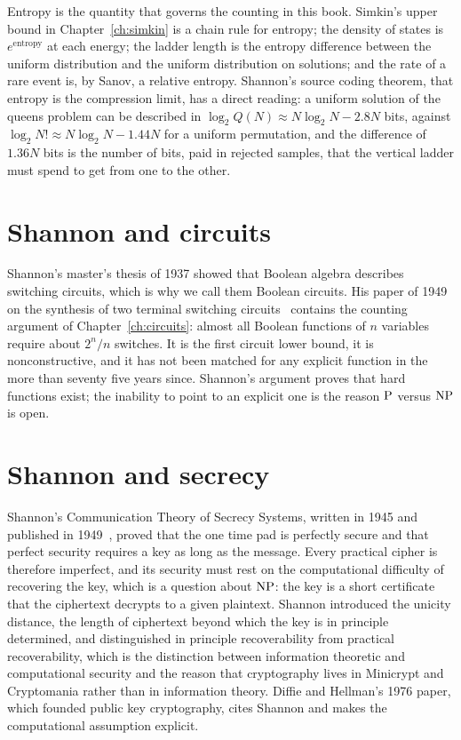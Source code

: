Entropy is the quantity that governs the counting in this book. Simkin's upper bound in Chapter~\ref{ch:simkin} is a chain rule for entropy; the density of states is $e^{\text{entropy}}$ at each energy; the ladder length is the entropy difference between the uniform distribution and the uniform distribution on solutions; and the rate of a rare event is, by Sanov, a relative entropy. Shannon's source coding theorem, that entropy is the compression limit, has a direct reading: a uniform solution of the queens problem can be described in $\log_2 Q(N) \approx N \log_2 N - 2.8 N$ bits, against $\log_2 N! \approx N \log_2 N - 1.44 N$ for a uniform permutation, and the difference of $1.36 N$ bits is the number of bits, paid in rejected samples, that the vertical ladder must spend to get from one to the other.

\section{Shannon and circuits}

Shannon's master's thesis of 1937 showed that Boolean algebra describes switching circuits, which is why we call them Boolean circuits. His paper of 1949 on the synthesis of two terminal switching circuits~\cite{Shannon49} contains the counting argument of Chapter~\ref{ch:circuits}: almost all Boolean functions of $n$ variables require about $2^n / n$ switches. It is the first circuit lower bound, it is nonconstructive, and it has not been matched for any explicit function in the more than seventy five years since. Shannon's argument proves that hard functions exist; the inability to point to an explicit one is the reason $\mathrm{P}$ versus $\mathrm{NP}$ is open.

\section{Shannon and secrecy}

Shannon's Communication Theory of Secrecy Systems, written in 1945 and published in 1949~\cite{Shannon49b}, proved that the one time pad is perfectly secure and that perfect security requires a key as long as the message. Every practical cipher is therefore imperfect, and its security must rest on the computational difficulty of recovering the key, which is a question about $\mathrm{NP}$: the key is a short certificate that the ciphertext decrypts to a given plaintext. Shannon introduced the unicity distance, the length of ciphertext beyond which the key is in principle determined, and distinguished in principle recoverability from practical recoverability, which is the distinction between information theoretic and computational security and the reason that cryptography lives in Minicrypt and Cryptomania rather than in information theory. Diffie and Hellman's 1976 paper, which founded public key cryptography, cites Shannon and makes the computational assumption explicit.

